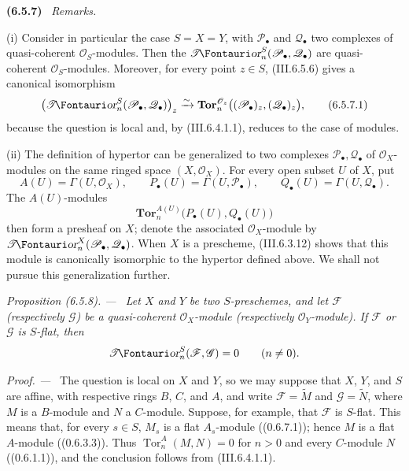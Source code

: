 \documentclass[10pt,oneside]{book}
\newcommand{\sh}[1]{\mathscr{#1}}
\newcommand{\shTor}{\sh{T}\textup{\kern-2.2pt{\Fontauri\slshape or}}}
\newcommand{\Tor}{\operatorname{Tor}}
\newcommand{\sref}[2][]{(#2)}
\newenvironment{env}[1][]{\par\medskip\noindent\textbf{(#1)}\ }{\par}
\newenvironment{proposition}[1][]{\par\medskip\noindent\itshape Proposition (#1). ---\ }{\par}
\newenvironment{proof}{\par\medskip\noindent\textit{Proof. ---\ }}{\par}
\begin{document}
\begin{env}[6.5.7]
\label{III.6.5.7}
\emph{Remarks.}

\textnormal{(i)} Consider in particular the case $S=X=Y$, with
$\sh P_\bullet$ and $\sh Q_\bullet$ two complexes of
quasi-coherent $\sh O_S$-modules.  Then the
$\shTor_n^S(\sh P_\bullet,\sh Q_\bullet)$ are quasi-coherent
$\sh O_S$-modules.  Moreover, for every point $z\in S$,
\sref{III.6.5.6} gives a canonical isomorphism
\[
  \bigl(\shTor_n^S(\sh P_\bullet,\sh Q_\bullet)\bigr)_z
  \xrightarrow{\sim}
  \mathbf{Tor}_n^{\sh O_z}
  \bigl((\sh P_\bullet)_z,(\sh Q_\bullet)_z\bigr),
  \tag{6.5.7.1}\label{III.6.5.7.1}
\]
because the question is local and, by \sref{III.6.4.1.1},
reduces to the case of modules.

\textnormal{(ii)} The definition of hypertor can be generalized
to two complexes $\sh P_\bullet,\sh Q_\bullet$ of
$\sh O_X$-modules on the same ringed space $(X,\sh O_X)$.  For
every open subset $U$ of $X$, put
\[
  A(U)=\Gamma(U,\sh O_X),\qquad
  P_\bullet(U)=\Gamma(U,\sh P_\bullet),\qquad
  Q_\bullet(U)=\Gamma(U,\sh Q_\bullet).
\]
The $A(U)$-modules
\[
  \mathbf{Tor}_n^{A(U)}\bigl(P_\bullet(U),Q_\bullet(U)\bigr)
\]
then form a presheaf on $X$; denote the associated
$\sh O_X$-module by
$\shTor_n^X(\sh P_\bullet,\sh Q_\bullet)$.  When $X$ is a
prescheme, \sref{III.6.3.12} shows that this module is
canonically isomorphic to the hypertor defined above.  We shall
not pursue this generalization further.
\end{env}

\begin{proposition}[6.5.8]
\label{III.6.5.8}
Let $X$ and $Y$ be two $S$-preschemes, and let $\sh F$
(respectively $\sh G$) be a quasi-coherent $\sh O_X$-module
(respectively $\sh O_Y$-module).  If $\sh F$ or $\sh G$ is
$S$-flat, then
\[
  \shTor_n^S(\sh F,\sh G)=0\qquad(n\ne0).
\]
\end{proposition}

\begin{proof}
The question is local on $X$ and $Y$, so we may suppose that
$X$, $Y$, and $S$ are affine, with respective rings $B$, $C$,
and $A$, and write $\sh F=\widetilde M$ and
$\sh G=\widetilde N$, where $M$ is a $B$-module and $N$ a
$C$-module.  Suppose, for example, that $\sh F$ is $S$-flat.
This means that, for every $s\in S$, $M_s$ is a flat
$A_s$-module (\sref[0]{0.6.7.1}); hence $M$ is a flat
$A$-module (\sref[0]{0.6.3.3}).  Thus
$\Tor_n^A(M,N)=0$ for $n>0$ and every $C$-module $N$
(\sref[0]{0.6.1.1}), and the conclusion follows from
\sref{III.6.4.1.1}.
\end{proof}
\end{document}
